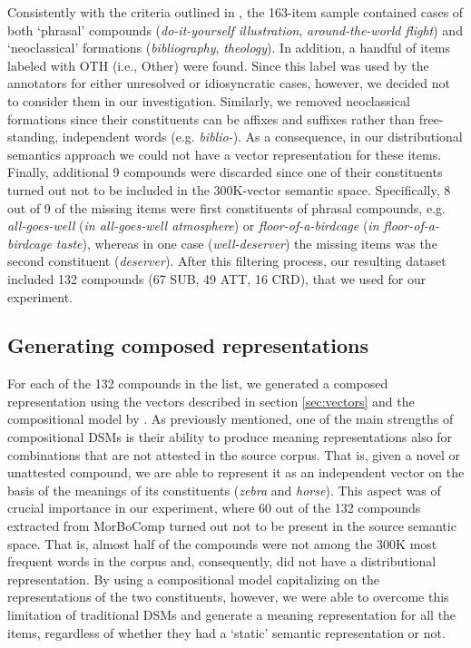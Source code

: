\documentclass[output=paper]{langsci/langscibook}
\begin{document}
Consistently with the criteria outlined in \cite{SB2005}, the 163-item sample contained cases of both `phrasal' compounds (\emph{do-it-yourself illustration}, \emph{around-the-world flight}) and `neoclassical' formations (\emph{bibliography}, \emph{theology}). In addition, a handful of items labeled with OTH (i.e., Other) were found. Since this label was used by the annotators for either unresolved or idiosyncratic cases, however, we decided not to consider them in our investigation. Similarly, we removed neoclassical formations since their constituents can be affixes and suffixes rather than free-standing, independent words (e.g. \emph{biblio-}). As a consequence, in our distributional semantics approach we could not have a vector representation for these items. Finally, additional 9 compounds were discarded since one of their constituents turned out not to be included in the 300K-vector semantic space. Specifically, 8 out of 9 of the missing items were first constituents of phrasal compounds, e.g. \emph{all-goes-well} (\emph{in all-goes-well atmosphere}) or \emph{floor-of-a-birdcage} (\emph{in floor-of-a-birdcage taste}), whereas in one case (\emph{well-deserver}) the missing items was the second constituent (\emph{deserver}). After this filtering process, our resulting dataset included 132 compounds (67 SUB, 49 ATT, 16 CRD), that we used for our experiment.


\subsection{Generating composed representations}


For each of the 132 compounds in the list, we generated a composed representation using the vectors described in section \ref{sec:vectors} and the compositional model by \cite{guevara2010}. As previously mentioned, one of the main strengths of compositional DSMs is their ability to produce meaning representations also for combinations that are not attested in the source corpus. That is, given a novel or unattested compound, we are able to represent it as an independent vector on the basis of the meanings of its constituents (\emph{zebra} and \emph{horse}). This aspect was of crucial importance in our experiment, where 60 out of the 132 compounds extracted from MorBoComp turned out not to be present in the source semantic space. That is, almost half of the compounds were not among the 300K most frequent words in the corpus and, consequently, did not have a distributional representation. By using a compositional model capitalizing on the representations of the two constituents, however, we were able to overcome this limitation of traditional DSMs and generate a meaning representation for all the items, regardless of whether they had a `static' semantic representation or not.
\end{document}
